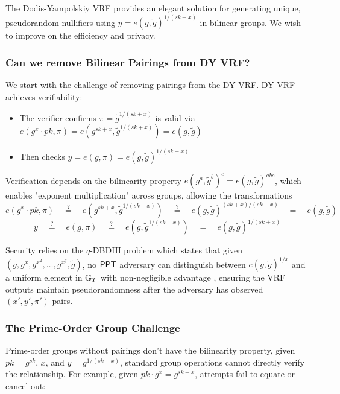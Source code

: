 The Dodis-Yampolskiy \cite{hutchison_verifiable_2005} VRF provides an elegant solution for generating unique, pseudorandom nullifiers using $y = e(g, \tilde{g})^{1/(sk+x)}$ in bilinear groups. We wish to improve on the efficiency and privacy. 

\subsubsection{Can we remove Bilinear Pairings from DY VRF?}

We start with the challenge of removing pairings from the DY VRF. DY VRF achieves verifiability:

\begin{itemize}
    \item The verifier confirms $\pi = \tilde{g}^{1/(sk+x)}$ is valid via $e(g^x \cdot pk, \pi) = e(g^{sk+x}, \tilde{g}^{1/(sk+x)}) = e(g, \tilde{g})$
    \item Then checks $y = e(g, \pi) = e(g, \tilde{g})^{1/(sk+x)}$
\end{itemize}

Verification depends on the bilinearity property $e(g^a, \tilde{g}^b)^c = e(g, \tilde{g})^{abc}$, which enables "exponent multiplication" across groups, allowing the transformations
\[
e(g^x \cdot pk, \pi) \quad \stackrel{?}{=} \quad e(g^{sk+x}, \tilde{g}^{1/(sk+x)}) \quad \stackrel{?}{=} \quad 
 e(g, \tilde{g})^{(sk+x)/(sk+x)} \quad  \stackrel{}{=} \quad e(g, \tilde{g})
\]
\[
y \quad \stackrel{?}{=} \quad e(g, \pi) \quad \stackrel{?}{=} \quad e(g,\tilde{g}^{1/(sk+x)}) \quad \stackrel{}{=} \quad e(g, \tilde{g})^{1/(sk+x)}
\]

Security relies on the $q$-DBDHI problem which states that given $(g, g^x, g^{x^2}, \ldots, g^{x^q}, \tilde{g})$, no $\mathsf{PPT}$ adversary can distinguish between $e(g,\tilde{g})^{1/x}$ and a uniform element in $\mathbb{G}_T$ with non-negligible advantage , ensuring the VRF outputs maintain pseudorandomness after the adversary has observed $(x',y',\pi')$ pairs.

\subsubsection{The Prime-Order Group Challenge}

Prime-order groups without pairings don't have the bilinearity property, given $pk = g^{sk}$, $x$, and $y = g^{1/(sk+x)}$, standard group operations cannot directly verify the relationship. For example, given $pk  \cdot g^x = g^{sk+x}$, attempts fail to equate or cancel out:

